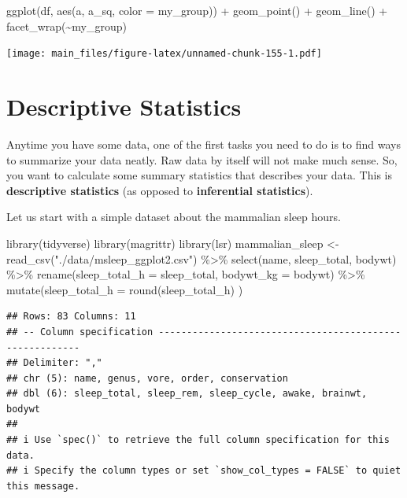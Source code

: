 \documentclass[
]{book}
\newenvironment{Shaded}{\begin{snugshade}}{\end{snugshade}}
\newcommand{\AttributeTok}[1]{\textcolor[rgb]{0.77,0.63,0.00}{#1}}
\newcommand{\FunctionTok}[1]{\textcolor[rgb]{0.00,0.00,0.00}{#1}}
\newcommand{\NormalTok}[1]{#1}
\newcommand{\OtherTok}[1]{\textcolor[rgb]{0.56,0.35,0.01}{#1}}
\newcommand{\SpecialCharTok}[1]{\textcolor[rgb]{0.00,0.00,0.00}{#1}}
\newcommand{\StringTok}[1]{\textcolor[rgb]{0.31,0.60,0.02}{#1}}
\begin{document}
\begin{Shaded}
\begin{Highlighting}[]
\FunctionTok{ggplot}\NormalTok{(df, }\FunctionTok{aes}\NormalTok{(a, a\_sq, }\AttributeTok{color =}\NormalTok{ my\_group)) }\SpecialCharTok{+} \FunctionTok{geom\_point}\NormalTok{()  }\SpecialCharTok{+} \FunctionTok{geom\_line}\NormalTok{() }\SpecialCharTok{+} \FunctionTok{facet\_wrap}\NormalTok{(}\SpecialCharTok{\textasciitilde{}}\NormalTok{my\_group)}
\end{Highlighting}
\end{Shaded}

\texttt{[image: main\_files/figure-latex/unnamed-chunk-155-1.pdf]}

\hypertarget{descriptive-statistics}{%
\chapter{Descriptive Statistics}\label{descriptive-statistics}}

Anytime you have some data, one of the first tasks you need to do is to find ways to summarize your data neatly. Raw data by itself will not make much sense. So, you want to calculate some summary statistics that describes your data. This is \textbf{descriptive statistics} (as opposed to \textbf{inferential statistics}).

Let us start with a simple dataset about the mammalian sleep hours.

\begin{Shaded}
\begin{Highlighting}[]
\FunctionTok{library}\NormalTok{(tidyverse)}
\FunctionTok{library}\NormalTok{(magrittr)}
\FunctionTok{library}\NormalTok{(lsr)}
\NormalTok{mammalian\_sleep }\OtherTok{\textless{}{-}} 
      \FunctionTok{read\_csv}\NormalTok{(}\StringTok{"./data/msleep\_ggplot2.csv"}\NormalTok{) }\SpecialCharTok{\%\textgreater{}\%} 
      \FunctionTok{select}\NormalTok{(name, sleep\_total, bodywt) }\SpecialCharTok{\%\textgreater{}\%}
      \FunctionTok{rename}\NormalTok{(}\AttributeTok{sleep\_total\_h =}\NormalTok{ sleep\_total, }\AttributeTok{bodywt\_kg =}\NormalTok{ bodywt) }\SpecialCharTok{\%\textgreater{}\%}
      \FunctionTok{mutate}\NormalTok{(}\AttributeTok{sleep\_total\_h =} \FunctionTok{round}\NormalTok{(sleep\_total\_h) )}
\end{Highlighting}
\end{Shaded}

\begin{verbatim}
## Rows: 83 Columns: 11
## -- Column specification --------------------------------------------------------
## Delimiter: ","
## chr (5): name, genus, vore, order, conservation
## dbl (6): sleep_total, sleep_rem, sleep_cycle, awake, brainwt, bodywt
## 
## i Use `spec()` to retrieve the full column specification for this data.
## i Specify the column types or set `show_col_types = FALSE` to quiet this message.
\end{verbatim}
\end{document}

